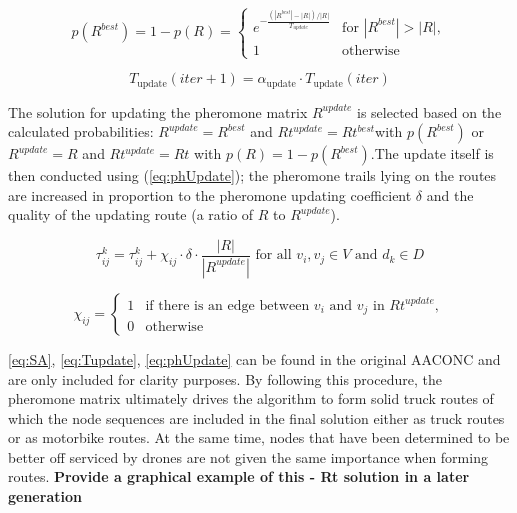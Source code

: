 \documentclass{article}
\begin{document}
	\begin{equation}
		p(R^{best}) = 1 - p(R) = 
		\begin{cases}
			e^{-\frac{(|R^{best}| - |R|)/|R|}{T_{update}}} & \text{for } |R^{best}| > |R|, \\
			1 & \text{otherwise}
		\end{cases}
		\label{eq:SA}
	\end{equation}
	
	\begin{equation}
		T_{\text{update}}(iter + 1) = \alpha_{\text{update}} \cdot T_{\text{update}}(iter)
		\label{eq:Tupdate}
	\end{equation}
	
	The solution for updating the pheromone matrix $R^{update}$ is selected based on the calculated probabilities:
	$R^{update} = R^{best}$ and $Rt^{update} = Rt^{best}$with $p(R^{best})$ or $R^{update} = R$ and $Rt^{update} = Rt$ with $p(R) = 1 - p(R^{best})$.The update itself is then conducted using (\ref{eq:phUpdate}); the pheromone trails lying on the routes are increased in proportion to the pheromone
	updating coefficient $\delta$ and the quality of the updating route (a ratio of $R$ to $R^{update}$).
	
	\begin{equation}
		\tau_{ij}^k = \tau_{ij}^k + \chi_{ij}\cdot \delta \cdot \frac{|R|}{|R^{update}|} \text{ for all } v_i,v_j \in V \text{ and } d_k\in D
		\label{eq:phUpdate}
	\end{equation}
	
	\begin{equation}
		\chi_{ij} = 
		\begin{cases}
			1 & \text{if there is an edge between }v_i \text{ and }v_j \text{ in }Rt^{update},\\
			0 & \text{otherwise}
		\end{cases}
		\label{eq:diff}
	\end{equation}

	\ref{eq:SA}, \ref{eq:Tupdate}, \ref{eq:phUpdate} can be found in the original AACONC and are only included for clarity purposes. By following this procedure, the pheromone matrix ultimately drives the algorithm to form solid truck routes of which the node sequences are included in the final solution either as truck routes or as motorbike routes. At the same time, nodes that have been determined to be better off serviced by drones are not given the same importance when forming routes. \textbf{Provide a graphical example of this - Rt solution in a later generation}
\end{document}
